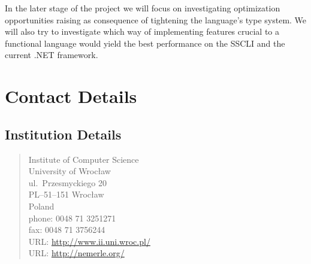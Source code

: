 \documentclass[a4paper,11pt]{article}
\begin{document}
In the later stage of the project we will focus on investigating 
optimization opportunities raising as consequence of tightening 
the language's type system. We will also try to investigate 
which way of implementing features crucial to a functional 
language would yield the best performance on the SSCLI and 
the current .NET framework.


\section{Contact Details}

\subsection{Institution Details}

\begin{samepage}
\begin{quote}
Institute of Computer Science\\
University of Wroc\l aw\\
ul.\ Przesmyckiego 20\\
PL--51--151 Wroc\l aw\\
Poland\\[2ex]
phone: 0048 71 3251271\\
fax:   0048 71 3756244\\
URL: \url{http://www.ii.uni.wroc.pl/}\\
URL: \url{http://nemerle.org/}
\end{quote}
\end{samepage}
\end{document}
